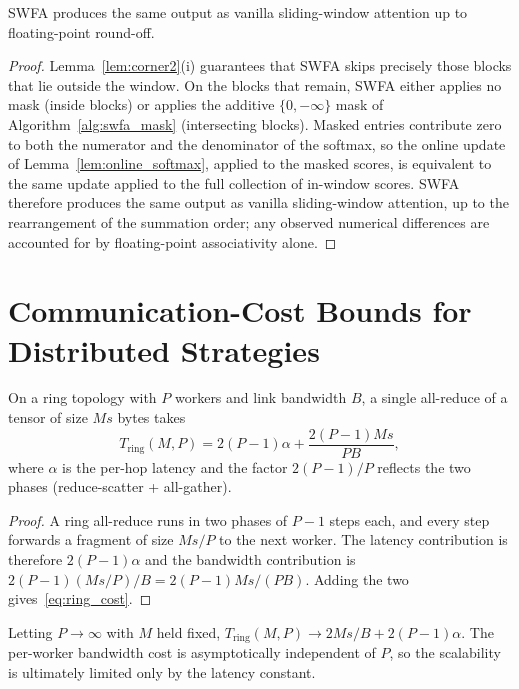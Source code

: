\begin{corollary}
SWFA produces the same output as vanilla sliding-window attention up
to floating-point round-off.
\end{corollary}

\begin{proof}
Lemma~\ref{lem:corner2}(i) guarantees that SWFA skips precisely
those blocks that lie outside the window. On the blocks that
remain, SWFA either applies no mask (inside blocks) or applies
the additive $\{0, -\infty\}$ mask of
Algorithm~\ref{alg:swfa_mask} (intersecting blocks). Masked
entries contribute zero to both the numerator and the
denominator of the softmax, so the online update of
Lemma~\ref{lem:online_softmax}, applied to the masked scores,
is equivalent to the same update applied to the full collection
of in-window scores. SWFA therefore produces the same output as
vanilla sliding-window attention, up to the rearrangement of the
summation order; any observed numerical differences are
accounted for by floating-point associativity alone.
\end{proof}

\section{Communication-Cost Bounds for
Distributed Strategies}\label{app:proof_comms}

\begin{lemma}\label{lem:ddp_bw}
On a ring topology with $P$ workers and link bandwidth $B$, a single
all-reduce of a tensor of size $M s$ bytes takes
\begin{equation}\label{eq:ring_cost}
    T_{\text{ring}}(M, P) =
    2 (P - 1) \alpha + \frac{2 (P - 1) M s}{P B},
\end{equation}
where $\alpha$ is the per-hop latency and the factor $2(P-1)/P$
reflects the two phases (reduce-scatter + all-gather).
\end{lemma}

\begin{proof}
A ring all-reduce runs in two phases of $P - 1$ steps each, and
every step forwards a fragment of size $M s / P$ to the next
worker. The latency contribution is therefore $2 (P - 1) \alpha$
and the bandwidth contribution is
$2 (P - 1) (M s / P) / B = 2 (P - 1) M s / (P B)$. Adding the
two gives~\eqref{eq:ring_cost}.
\end{proof}

\begin{corollary}\label{cor:ddp_limit}
Letting $P \to \infty$ with $M$ held fixed,
$T_{\text{ring}}(M, P) \to 2 M s / B + 2 (P - 1) \alpha$. The
per-worker bandwidth cost is asymptotically independent of $P$,
so the scalability is ultimately limited only by the latency
constant.
\end{corollary}


